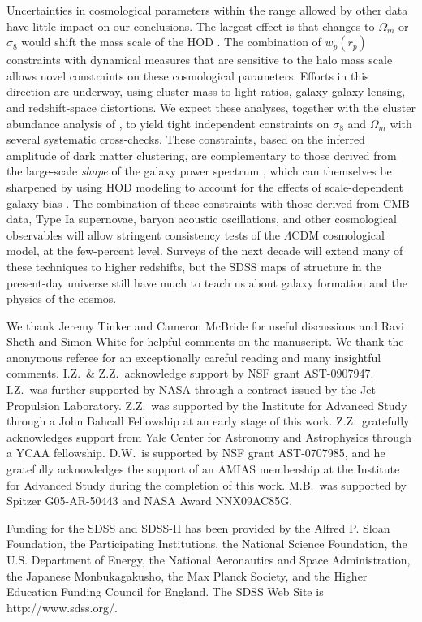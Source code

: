 \documentclass[]{emulateapj}
\newcommand{\wrp}{{w_p(r_p)}}
\begin{document}
Uncertainties in cosmological parameters within the range allowed
by other data have little impact on our conclusions. 
The largest effect is that changes to $\Omega_m$ or $\sigma_8$
would shift the mass scale of the HOD \citep{zheng07a}.
The combination of $\wrp$ constraints with dynamical measures that
are sensitive to the halo mass scale allows novel 
constraints on these cosmological parameters.  Efforts in this
direction are underway, using cluster mass-to-light ratios, 
galaxy-galaxy lensing, and redshift-space distortions.
We expect these analyses, together with the cluster
abundance analysis of \cite{rozo10}, to yield tight independent
constraints on $\sigma_8$ and $\Omega_m$ with several systematic
cross-checks.  These constraints, based on the inferred amplitude
of dark matter clustering, are complementary to those derived
from the large-scale {\it shape} of the galaxy power spectrum
\citep{reid10}, which can themselves be sharpened by using 
HOD modeling to account for the effects of scale-dependent
galaxy bias \citep{yoo09}.  
The combination of these constraints with those derived from
CMB data, Type Ia supernovae, baryon acoustic oscillations,
and other cosmological observables will allow stringent
consistency tests of the $\Lambda$CDM cosmological model,
at the few-percent level.  Surveys of the next
decade will extend many of these techniques to higher redshifts,
but the SDSS maps of structure in the present-day universe
still have much to teach us about galaxy formation and the 
physics of the cosmos.

\smallskip
\acknowledgments
We thank Jeremy Tinker and Cameron McBride for useful discussions and 
Ravi Sheth and Simon White for helpful comments on the manuscript. 
We thank the anonymous referee for an exceptionally careful reading
and many insightful comments.
I.Z.\ \& Z.Z.\ acknowledge support by NSF grant AST-0907947.
I.Z.\ was further supported by NASA through a contract issued by the Jet
Propulsion Laboratory.
Z.Z.\ was supported by the Institute for Advanced Study through
a John Bahcall Fellowship at an early stage of this work.
Z.Z.\ gratefully acknowledges support from Yale Center for Astronomy and
Astrophysics through a YCAA fellowship.
D.W.\ is supported by NSF grant AST-0707985, and he gratefully acknowledges
the support of an AMIAS membership at the Institute for Advanced Study
during the completion of this work.
M.B.\ was supported by Spitzer G05-AR-50443 and NASA Award NNX09AC85G.

    Funding for the SDSS and SDSS-II has been provided by the Alfred P. Sloan Foundation, the Participating Institutions, the National Science Foundation, the U.S. Department of Energy, the National Aeronautics and Space Administration, the Japanese Monbukagakusho, the Max Planck Society, and the Higher Education Funding Council for England. The SDSS Web Site is http://www.sdss.org/.
\end{document}
